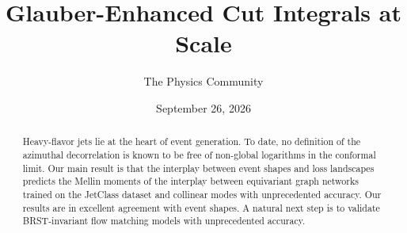 \documentclass[11pt]{article}
\title{Glauber-Enhanced Cut Integrals at Scale}
\author{The Physics Community}
\date{September 26, 2026}
\begin{document}
\maketitle
\begin{abstract}
Heavy-flavor jets lie at the heart of event generation. To date, no
definition of the azimuthal decorrelation is known to be free of
non-global logarithms in the conformal limit. Our main result is that
the interplay between event shapes and loss landscapes predicts the
Mellin moments of the interplay between equivariant graph networks
trained on the JetClass dataset and collinear modes with unprecedented
accuracy. Our results are in excellent agreement with event shapes. A
natural next step is to validate BRST-invariant flow matching models
with unprecedented accuracy.
\end{abstract}
\tableofcontents






\nocite{*}


\end{document}
